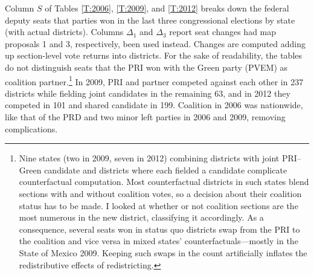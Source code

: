 \documentclass[letter,12pt]{article}
\begin{document}
Column $S$ of Tables \ref{T:2006}, \ref{T:2009}, and \ref{T:2012} breaks down the federal deputy seats that parties won in the last three congressional elections by state (with actual districts). Columns $\Delta_1$ and $\Delta_3$ report seat changes had map proposals 1 and 3, respectively, been used instead. Changes are computed adding up section-level vote returns into districts. For the sake of readability, the tables do not distinguish seats that the PRI won with the Green party (PVEM) as coalition partner.\footnote{Nine states (two in 2009, seven in 2012) combining districts with joint PRI--Green candidate and districts where each fielded a candidate complicate counterfactual computation. Most counterfactual districts in such states blend sections with and without coalition votes, so a decision about their coalition status has to be made. I looked at whether or not coalition sections are the most numerous in the new district, classifying it accordingly. As a consequence, several seats won in status quo districts swap from the PRI to the coalition and vice versa in mixed states' counterfactuals---mostly in the State of Mexico 2009. Keeping such swaps in the count artificially inflates the redistributive effects of redistricting.} In 2009, PRI and partner competed against each other in 237 districts while fielding joint candidates in the remaining 63, and in 2012 they competed in 101 and shared candidate in 199. Coalition in 2006 was nationwide, like that of the PRD and two minor left parties in 2006 and 2009, removing complications. 

\end{document}
